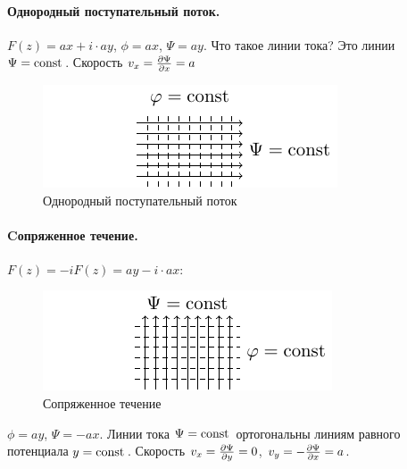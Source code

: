 \paragraph{Однородный поступательный поток.} $F(z)=ax+i\cdot ay$, $\phi=ax$, $\Psi=ay$. Что такое линии тока? Это линии $\Psi=\mathrm{const}\,$. Скорость $v_x=\pdv{\Psi}{x}=a$

\begin{figure}[h!]
    \centering
    \includegraphics[scale=1.5]{img/potent}
    \caption{Однородный поступательный поток}
    \label{fig:figure1}
\end{figure}





\paragraph{Cопряженное течение.} $F(z)=-iF(z)=ay - i\cdot ax$:

\begin{figure}[h!]
    \centering
    \includegraphics[scale=1.5]{img/sopr_potent}
    \caption{Сопряженное течение}
    \label{fig:figure1}
\end{figure}
$\phi=ay$, $\Psi=-ax$. Линии тока $\Psi=\mathrm{const}\,$ ортогональны линиям равного потенциала $y=\mathrm{const}\,$. Скорость $v_x=\pdv{\Psi}{y}=0$, $v_y=-\pdv{\Psi}{x}=a$.

